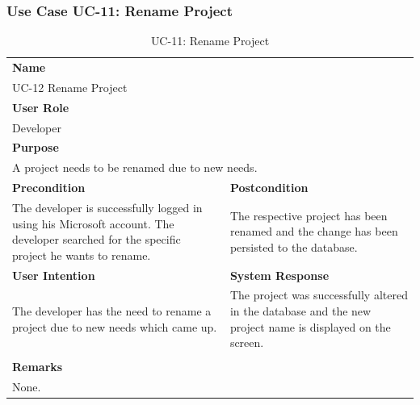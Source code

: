 
\subsubsection{Use Case UC-11: Rename Project}\label{subsubsec:use-case-uc-11:-rename-project}

\begin{table}[H]
    \centering
    \begin{tabular}{|p{}|p{}|}

        \hline
        \multicolumn{2}{|l|}{\rowcolor{gray!50}\textbf{Name}} \\
        \multicolumn{2}{|l|}{UC-12 Rename Project} \\ \hline

        \multicolumn{2}{|l|}{\rowcolor{gray!50}\textbf{User Role}} \\
        \multicolumn{2}{|l|}{Developer} \\ \hline

        \multicolumn{2}{|l|}{\rowcolor{gray!50}\textbf{Purpose}} \\
        \multicolumn{2}{|p{1\textwidth}|}{A project needs to be renamed due to new needs.} \\ \hline

        \rowcolor{gray!50}\textbf{Precondition} & \rowcolor{gray!50}\textbf{Postcondition} \\
        The developer is successfully logged in using his Microsoft account.
        The developer searched for the specific project he wants to rename.
        &
        The respective project has been renamed and the change has been persisted to the database.\\ \hline

        \rowcolor{gray!50}\textbf{User Intention} & \rowcolor{gray!50}\textbf{System Response} \\
        The developer has the need to rename a project due to new needs which came up.
        &
        The project was successfully altered in the database and the new project name is displayed on the screen. \\ \hline

        & \\ \hline

        \multicolumn{2}{|l|}{\rowcolor{gray!50}\textbf{Remarks}} \\
        \multicolumn{2}{|p{1\textwidth}|}{None.} \\ \hline
    \end{tabular}
    \caption{UC-11: Rename Project}
    \label{tab:uc-rename-project}
\end{table}

